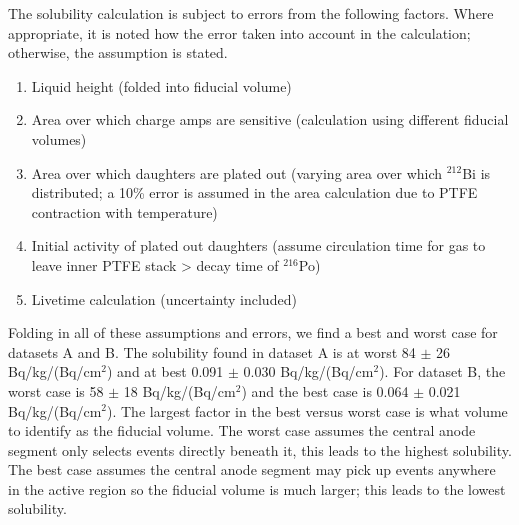 \begin{table}[ht]
\begin{tabular}{lcc}
\\[-5pt]

\\[-5pt]

\hline
\end{tabular}
\label{T:solubility}
\end{table}


The solubility calculation is subject to errors from the following factors. Where appropriate, it is noted how the error taken into account in the calculation; otherwise, the assumption is stated.
\begin{enumerate}
\item Liquid height (folded into fiducial volume)
\item Area over which charge amps are sensitive (calculation using different fiducial volumes)
\item Area over which daughters are plated out (varying area over which $^{212}$Bi is distributed; a 10\% error is assumed in the area calculation due to \ac{PTFE} contraction with temperature)
\item Initial activity of plated out daughters (assume circulation time for gas to leave inner PTFE stack > decay time of $^{216}$Po)
\item Livetime calculation (uncertainty included)
\end{enumerate}

Folding in all of these assumptions and errors, we find a best and worst case for datasets A and B. The solubility found in dataset A is at worst 84 $\pm$ 26 Bq/kg/(Bq/cm$^{2}$) and at best 0.091 $\pm$ 0.030 Bq/kg/(Bq/cm$^{2}$). For dataset B, the worst case is 58 $\pm$ 18 Bq/kg/(Bq/cm$^{2}$) and the best case is 0.064 $\pm$ 0.021 Bq/kg/(Bq/cm$^{2}$). The largest factor in the best versus worst case is what volume to identify as the fiducial volume. The worst case assumes the central anode segment only selects events directly beneath it, this leads to the highest solubility. The best case assumes the central anode segment may pick up events anywhere in the active region so the fiducial volume is much larger; this leads to the lowest solubility.

